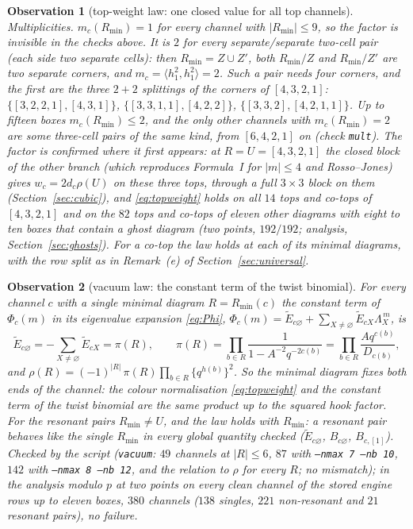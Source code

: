 \documentclass[11pt]{article}
\newtheorem{observation}{Observation}
\newcommand{\Lam}{\Lambda}
\newcommand{\Et}{\widetilde{E}}
\newcommand{\vac}{\varnothing}
\newcommand{\LMPH}[1]{\texttt{#1}}
\begin{document}
\begin{observation}[top-weight law: one closed value for all top channels]
\emph{Multiplicities.}  $m_c(R_{\min})=1$ for every channel with $|R_{\min}|\le9$, so the factor is invisible in the checks
above.  It is $2$ for every separate/separate two-cell pair (each side two separate cells): then $R_{\min}=Z\cup Z'$,
both $R_{\min}/Z$ and $R_{\min}/Z'$ are two separate corners, and $m_c=\langle h_1^2,h_1^2\rangle=2$.  Such a pair needs
four corners, and the first are the three $2+2$ splittings of the corners of $[4,3,2,1]$: $\{[3,2,2,1],[4,3,1]\}$,
$\{[3,3,1,1],[4,2,2]\}$, $\{[3,3,2],[4,2,1,1]\}$.  Up to fifteen boxes $m_c(R_{\min})\le2$, and the only other channels with
$m_c(R_{\min})=2$ are some three-cell pairs of the same kind, from $[6,4,2,1]$ on (check \LMPH{mult}).  The factor is
confirmed where it first appears: at $R=U=[4,3,2,1]$ the closed block of the other branch (which reproduces Formula~I for
$|m|\le4$ and Rosso--Jones) gives $w_c=2d_c\rho(U)$ on these three tops, through a full $3\times3$ block on them
(Section~\ref{sec:cubic}), and \eqref{eq:topweight} holds on all $14$ tops
and co-tops of $[4,3,2,1]$ and on the $82$ tops and co-tops of eleven other diagrams with eight to ten boxes that contain
a ghost diagram (two points, $192/192$; analysis, Section~\ref{sec:ghosts}).  For a co-top the law holds at each of its
minimal diagrams, with the row split as in Remark~(e) of Section~\ref{sec:universal}.
\end{observation}

\begin{observation}[vacuum law: the constant term of the twist binomial]\label{obs:vacuum}
For every channel $c$ with a single minimal diagram $R=R_{\min}(c)$ the constant term of $\Phi_c(m)$ in its eigenvalue
expansion \eqref{eq:Phi}, $\Phi_c(m)=\Et_{c\vac}+\sum_{X\ne\vac}\Et_{cX}\Lam_X^{\,m}$, is
\begin{equation}\label{eq:vacuum}
\Et_{c\vac}=-\sum_{X\ne\vac}\Et_{cX}=\pi(R),\qquad
\pi(R)=\prod_{b\in R}\frac1{1-A^{-2}q^{-2c(b)}}=\prod_{b\in R}\frac{Aq^{c(b)}}{D_{c(b)}},
\end{equation}
and $\rho(R)=(-1)^{|R|}\,\pi(R)\prod_{b\in R}\{q^{h(b)}\}^2$.  So the minimal diagram fixes both ends of the channel: the
colour normalisation \eqref{eq:topweight} and the constant term of the twist binomial are the same product up to the
squared hook factor.  For the resonant pairs $R_{\min}\ne U$,
and the law holds with $R_{\min}$: a resonant pair behaves like the single $R_{\min}$ in every global quantity checked
($\Et_{c\vac}$, $B_{c\vac}$, $B_{c,[1]}$).  Checked by the script (\LMPH{vacuum}: $49$ channels at $|R|\le6$, $87$ with
\LMPH{--nmax 7 --nb 10}, $142$ with \LMPH{--nmax 8 --nb 12}, and the relation to $\rho$ for every $R$; no mismatch); in
the analysis modulo $p$ at two points on every clean channel of the stored engine rows up to eleven boxes, $380$ channels
($138$ singles, $221$ non-resonant and $21$ resonant pairs), no failure.
\end{observation}
\end{document}
